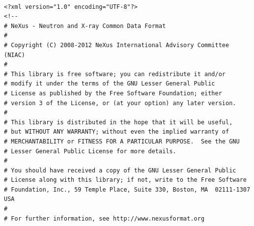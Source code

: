 \documentclass[a4paper]{article}\usepackage[dvips]{graphicx}
\begin{document}
\begin{verbatim}

<?xml version="1.0" encoding="UTF-8"?>
<!--
# NeXus - Neutron and X-ray Common Data Format
# 
# Copyright (C) 2008-2012 NeXus International Advisory Committee (NIAC)
# 
# This library is free software; you can redistribute it and/or
# modify it under the terms of the GNU Lesser General Public
# License as published by the Free Software Foundation; either
# version 3 of the License, or (at your option) any later version.
#
# This library is distributed in the hope that it will be useful,
# but WITHOUT ANY WARRANTY; without even the implied warranty of
# MERCHANTABILITY or FITNESS FOR A PARTICULAR PURPOSE.  See the GNU
# Lesser General Public License for more details.
#
# You should have received a copy of the GNU Lesser General Public
# License along with this library; if not, write to the Free Software
# Foundation, Inc., 59 Temple Place, Suite 330, Boston, MA  02111-1307  USA
#
# For further information, see http://www.nexusformat.org


\end{verbatim}
\end{document}
